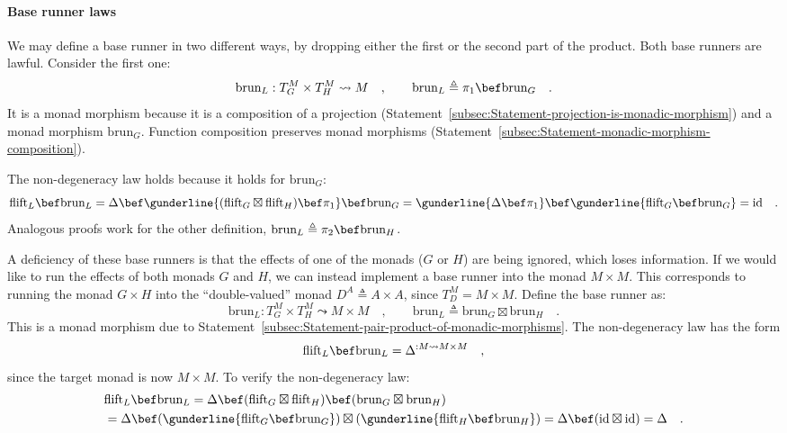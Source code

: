 \paragraph{Base runner laws}

We may define a base runner in two different ways, by dropping either
the first or the second part of the product. Both base runners are
lawful. Consider the first one:
\[
\text{brun}_{L}:T_{G}^{M}\times T_{H}^{M}\leadsto M\quad,\quad\quad\text{brun}_{L}\triangleq\pi_{1}\bef\text{brun}_{G}\quad.
\]
It is a monad morphism because it is a composition of a projection
(Statement~\ref{subsec:Statement-projection-is-monadic-morphism})
and a monad morphism $\text{brun}_{G}$. Function composition preserves
monad morphisms (Statement~\ref{subsec:Statement-monadic-morphism-composition}).

The non-degeneracy law holds because it holds for $\text{brun}_{G}$:
\[
\text{flift}_{L}\bef\text{brun}_{L}=\Delta\bef\gunderline{(\text{flift}_{G}\boxtimes\text{flift}_{H})\bef\pi_{1}}\bef\text{brun}_{G}=\gunderline{\Delta\bef\pi_{1}}\bef\gunderline{\text{flift}_{G}\bef\text{brun}_{G}}=\text{id}\quad.
\]
Analogous proofs work for the other definition, $\text{brun}_{L}\triangleq\pi_{2}\bef\text{brun}_{H}$.

A deficiency of these base runners is that the effects of one of the
monads ($G$ or $H$) are being ignored, which loses information.
If we would like to run the effects of both monads $G$ and $H$,
we can instead implement a base runner into the monad $M\times M$.
This corresponds to running the monad $G\times H$ into the \textsf{``}double-valued\textsf{''}
monad $D^{A}\triangleq A\times A$, since $T_{D}^{M}=M\times M$.
Define the base runner as:
\[
\text{brun}_{L}:T_{G}^{M}\times T_{H}^{M}\leadsto M\times M\quad,\quad\quad\text{brun}_{L}\triangleq\text{brun}_{G}\boxtimes\text{brun}_{H}\quad.
\]
This is a monad morphism due to Statement~\ref{subsec:Statement-pair-product-of-monadic-morphisms}.
The non-degeneracy law has the form
\[
\text{flift}_{L}\bef\text{brun}_{L}=\Delta^{:M\leadsto M\times M}\quad,
\]
since the target monad is now $M\times M$. To verify the non-degeneracy
law:
\begin{align*}
 & \text{flift}_{L}\bef\text{brun}_{L}=\Delta\bef(\text{flift}_{G}\boxtimes\text{flift}_{H})\bef(\text{brun}_{G}\boxtimes\text{brun}_{H})\\
 & =\Delta\bef(\gunderline{\text{flift}_{G}\bef\text{brun}_{G}})\boxtimes(\gunderline{\text{flift}_{H}\bef\text{brun}_{H}})=\Delta\bef(\text{id}\boxtimes\text{id})=\Delta\quad.
\end{align*}


